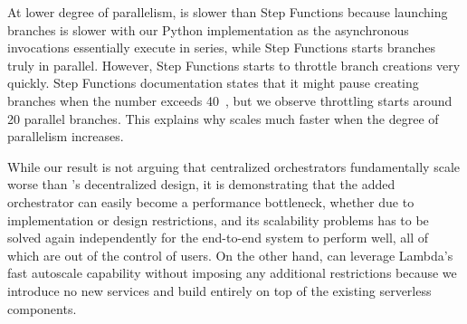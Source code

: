 At lower degree of parallelism, \name{} is slower than Step Functions because
launching branches is slower with our Python implementation as the
asynchronous invocations essentially execute in series, while Step Functions
starts branches truly in parallel. However, Step Functions starts to throttle
branch creations very quickly. Step Functions documentation states that it
might pause creating branches when the number exceeds
40~\cite{aws-step-functions-map-state}, but we observe throttling starts
around 20 parallel branches. This explains why \name{} scales much faster when
the degree of parallelism increases.

While our result is not arguing that centralized orchestrators fundamentally
scale worse than \name{}'s decentralized design, it is demonstrating that the
added orchestrator can easily become a performance bottleneck, whether due to
implementation or design restrictions, and its scalability problems has to be
solved again independently for the end-to-end system to perform well, all of which are out of the control of users. On the
other hand, \name{} can leverage Lambda's fast autoscale capability without
imposing any additional restrictions because we introduce no new services and
build entirely on top of the existing serverless components.





